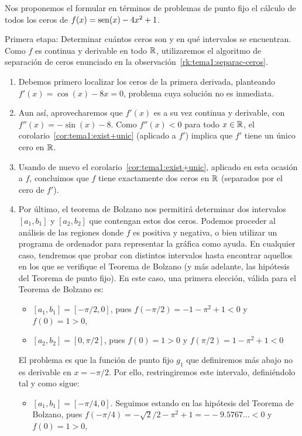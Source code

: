 \begin{example}
  Nos proponemos el formular en términos de problemas de punto fijo el
  cálculo de todos los ceros de $f(x)=\operatorname{sen}(x)-4x^2+1$. 

  
  \textsf{Primera etapa:} Determinar cuántos ceros son y en qué
  intervalos se encuentran. Como $f$ es continua y derivable en todo
  $\operatorname{{\mathbb R}}$, utilizaremos el algoritmo de separación de ceros enunciado
  en la observación~\ref{rk:tema1:separac-ceros}.
  \begin{enumerate}
  \item Debemos primero localizar los ceros de la primera
    derivada, planteando $f'(x)=\cos(x)-8x=0$, problema cuya solución
    no es inmediata.
  \item Aun así, aprovecharemos que $f'(x)$ es a su vez continua y
    derivable, con $f''(x)=-\sin(x)-8$. Como $f''(x)<0$ para todo
    $x\in\operatorname{{\mathbb R}}$, el corolario~\ref{cor:tema1:exist+unic} (aplicado a
    $f'$) implica que $f'$ tiene un único cero en $\operatorname{{\mathbb R}}$.
  \item Usando de nuevo el
    corolario~\ref{cor:tema1:exist+unic}, aplicado en esta ocasión a
    $f$, concluimos que $f$ tiene exactamente dos ceros en $\operatorname{{\mathbb R}}$
    (separados por el cero de $f'$).
  \item Por último, el teorema de Bolzano nos permitirá determinar dos
    intervalos $[a_1,b_1]$ y $[a_2,b_2]$ que contengan estos dos
    ceros. Podemos proceder al análisis de las regiones donde $f$ es
    positiva y negativa, o bien utilizar un programa de ordenador para
    representar la gráfica como ayuda. En cualquier caso, tendremos
    que probar con distintos intervalos hasta encontrar aquellos en
    los que se verifique el Teorema de Bolzano (y más adelante, las
    hipótesis del Teorema de punto fijo). En este caso, una primera
    elección, válida para el Teorema de Bolzano es:
    \begin{itemize}
    \item $[a_1,b_1]=[-\pi/2, 0]$, pues $f(-\pi/2)=-1-\pi^2+1<0$ y
      $f(0)=1>0$,
    \item $[a_2,b_2]=[0, \pi/2]$, pues $f(0)=1>0$ y $f(\pi/2)= 1-\pi^2+1<0$
    \end{itemize}
    El problema es que la función de punto fijo $g_1$ que definiremos
    más abajo no es derivable en $x=-\pi/2$. Por ello, restringiremos
    este intervalo, definiéndolo tal y como sigue:
    \begin{itemize}
    \item $[a_1,b_1]=[-\pi/4, 0]$. Seguimos estando en las hipótesis
      del Teorema de Bolzano, pues $f(-\pi/4)=
      -\sqrt{2}/2-\pi^2+1=--9.5767...<0$ y $f(0)=1>0$,
    \end{itemize}
  \end{enumerate}


\end{example}
